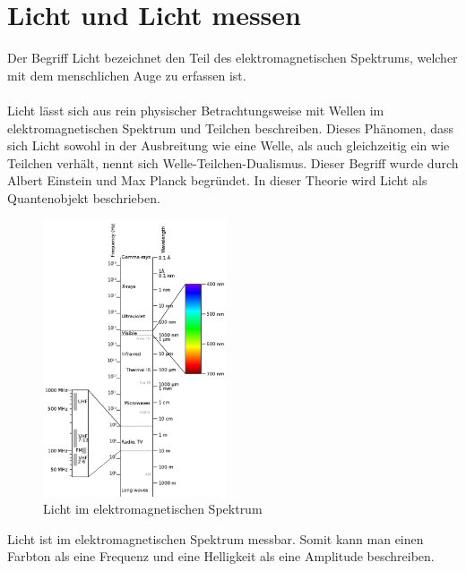 \documentclass[11pt]{scrartcl}
\begin{document}
\section{Licht und Licht messen} \label{light and measurement}
Der Begriff Licht bezeichnet den Teil des elektromagnetischen Spektrums, welcher mit dem menschlichen Auge zu erfassen ist.\\
\\
Licht lässt sich aus rein physischer Betrachtungsweise mit Wellen im elektromagnetischen Spektrum und Teilchen beschreiben. Dieses Phänomen, dass sich
Licht sowohl in der Ausbreitung wie eine Welle, als auch gleichzeitig ein wie Teilchen verhält, nennt sich Welle-Teilchen-Dualismus.
Dieser Begriff wurde durch Albert Einstein und Max Planck begründet. In dieser Theorie wird Licht als Quantenobjekt
beschrieben. \cite{wikiLicht}\\
\begin{figure}
    \vspace{-25pt}
    \begin{center}
        \includegraphics[width=0.48\textwidth]{images/Elektromagnetisches-Spektrum.png}
    \end{center}
    \vspace{-20pt}
    \caption{Licht im elektromagnetischen Spektrum \cite{spectrumLight}}
    \vspace{-15pt}
\end{figure}
\noindent
Licht ist im elektromagnetischen Spektrum messbar. Somit kann man einen Farbton als eine Frequenz und eine Helligkeit als eine Amplitude beschreiben.
\end{document}
